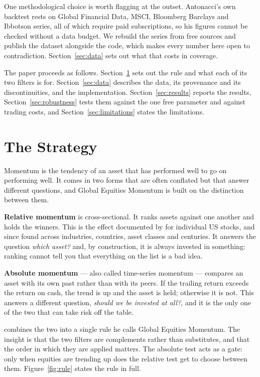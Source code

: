 \documentclass[11pt,a4paper]{article}
\let\oldsection\section
\renewcommand{\section}{\FloatBarrier\oldsection}
\begin{document}
One methodological choice is worth flagging at the outset. Antonacci's own
backtest rests on Global Financial Data, MSCI, Bloomberg Barclays and Ibbotson
series, all of which require paid subscriptions, so his figures cannot be
checked without a data budget. We rebuild the series from free sources and
publish the dataset alongside the code, which makes every number here open to
contradiction. Section~\ref{sec:data} sets out what that costs in coverage.

The paper proceeds as follows. Section~\ref{sec:strategy} sets out the rule and
what each of its two filters is for. Section~\ref{sec:data} describes the data,
its provenance and its discontinuities, and the implementation.
Section~\ref{sec:results} reports the results, Section~\ref{sec:robustness}
tests them against the one free parameter and against trading costs, and
Section~\ref{sec:limitations} states the limitations.

\section{The Strategy}
\label{sec:strategy}

Momentum is the tendency of an asset that has performed well to go on
performing well. It comes in two forms that are often conflated but that answer
different questions, and Global Equities Momentum is built on the distinction
between them.

\textbf{Relative momentum} is cross-sectional. It ranks assets against one
another and holds the winners. This is the effect documented by
\citet{jegadeesh1993} for individual US stocks, and since found across
industries, countries, asset classes and centuries. It answers the question
\emph{which asset?} and, by construction, it is always invested in something:
ranking cannot tell you that everything on the list is a bad idea.

\textbf{Absolute momentum} --- also called time-series momentum
\citep{moskowitz2012} --- compares an asset with its own past rather than with
its peers. If the trailing return exceeds the return on cash, the trend is up
and the asset is held; otherwise it is not. This answers a different question,
\emph{should we be invested at all?}, and it is the only one of the two that
can take risk off the table.

\citet{antonacci2016} combines the two into a single rule he calls Global
Equities Momentum. The insight is that the two filters are complements rather
than substitutes, and that the order in which they are applied matters. The
absolute test acts as a gate: only when equities are trending up does the
relative test get to choose between them. Figure~\ref{fig:rule} states the rule
in full.
\end{document}
